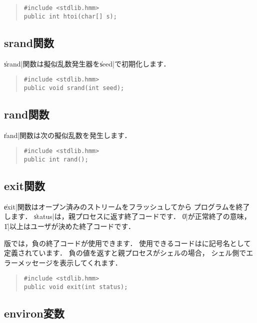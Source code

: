 \begin{quote}
\begin{verbatim}
#include <stdlib.hmm>
public int htoi(char[] s);
\end{verbatim}
\end{quote}

\subsection{srand関数}

\|srand|関数は擬似乱数発生器を\|seed|で初期化します．

\begin{quote}
\begin{verbatim}
#include <stdlib.hmm>
public void srand(int seed);
\end{verbatim}
\end{quote}

\subsection{rand関数}

\|rand|関数は次の擬似乱数を発生します．

\begin{quote}
\begin{verbatim}
#include <stdlib.hmm>
public int rand();
\end{verbatim}
\end{quote}

\subsection{exit関数}

\|exit|関数はオープン済みのストリームをフラッシュしてから
プログラムを終了します．
\|status|は，親プロセスに返す終了コードです．
\|0|が正常終了の意味，\|1|以上はユーザが決めた終了コードです．

{\tacos}版では，負の終了コードが使用できます．
使用できるコードはに記号名として定義されています．
負の値を返すと親プロセスがシェルの場合，
シェル側でエラーメッセージを表示してくれます．

\begin{quote}
\begin{verbatim}
#include <stdlib.hmm>
public void exit(int status);
\end{verbatim}
\end{quote}

\subsection{environ変数}

